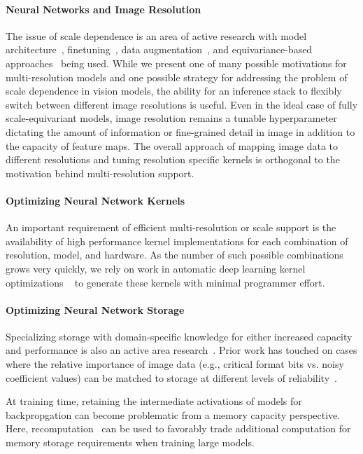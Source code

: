 \paragraph{Neural Networks and Image Resolution}
The issue of scale dependence is an area of active research with model architecture~\cite{DBLP:journals/corr/KanazawaSJ14}, finetuning~\cite{touvron2019fixing}, data augmentation~\cite{hoffer2019mix}, and equivariance-based approaches~\cite{sosnovik2019scaleequivariant} being used.
While we present one of many possible motivations for multi-resolution models and one possible strategy for addressing the problem of scale dependence in vision models, the ability for an inference stack to flexibly switch between different image resolutions is useful.
Even in the ideal case of fully scale-equivariant models, image resolution remains a tunable hyperparameter dictating the amount of information or fine-grained detail in image in addition to the capacity of feature maps.
The overall approach of mapping image data to different resolutions and tuning resolution specific kernels is orthogonal to the motivation behind multi-resolution support.


\paragraph{Optimizing Neural Network Kernels}
An important requirement of efficient multi-resolution or scale support is the availability of high performance kernel implementations for each combination of resolution, model, and hardware.
As the number of such possible combinations grows very quickly, we rely on work in automatic deep learning kernel optimizations ~\cite{ragan2013halide, chen2018tvm, zheng2020ansor, cowan2020automatic} to generate these kernels with minimal programmer effort.

\paragraph{Optimizing Neural Network Storage}
Specializing storage with domain-specific knowledge for either increased capacity and performance is also an active area research~\cite{sampson2014approximate, jevdjic2017approximate, mazumdar2019vignette}.
Prior work has touched on cases where the relative importance of image data (e.g., critical format bits vs. noisy coefficient values) can be matched to storage at different levels of reliability~\cite{guo2016high, jevdjic2017approximate}.

At training time, retaining the intermediate activations of models for backpropgation can become problematic from a memory capacity perspective.
Here, recomputation~\cite{chen2016xgboost, kirisame2020dynamic} can be used to favorably trade additional computation for memory storage requirements when training large models.

